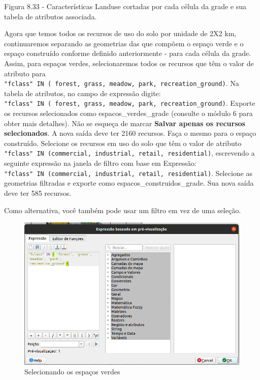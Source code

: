 \documentclass[
]{krantz}
\begin{document}
Figura 8.33 - Características Landuse cortadas por cada célula da grade e sua tabela de atributos associada.

Agora que temos todos os recursos de uso do solo por unidade de 2X2 km, continuaremos separando as geometrias das que compõem o espaço verde e o espaço construído conforme definido anteriormente - para cada célula da grade. Assim, para espaços verdes, selecionaremos todos os recursos que têm o valor de atributo para \texttt{"fclass"\ IN\ (\ \textquotesingle{}forest\textquotesingle{},\ \textquotesingle{}grass\textquotesingle{},\ \textquotesingle{}meadow\textquotesingle{},\ \textquotesingle{}park\textquotesingle{},\ \textquotesingle{}recreation\_ground\textquotesingle{})}. Na tabela de atributos, no campo de expressão digite: \texttt{"fclass"\ IN\ (\ \textquotesingle{}forest\textquotesingle{},\ \textquotesingle{}grass\textquotesingle{},\ \textquotesingle{}meadow\textquotesingle{},\ \textquotesingle{}park\textquotesingle{},\ \textquotesingle{}recreation\_ground\textquotesingle{})}. Exporte os recursos selecionados como espacos\_verdes\_grade (consulte o módulo 6 para obter mais detalhes). Não se esqueça de marcar \textbf{Salvar apenas os recursos selecionados}. A nova saída deve ter 2160 recursos. Faça o mesmo para o espaço construído. Selecione os recursos em uso do solo que têm o valor de atributo \texttt{"fclass"\ IN\ (\textquotesingle{}commercial\textquotesingle{},\ \textquotesingle{}industrial\textquotesingle{},\ \textquotesingle{}retail\textquotesingle{},\ \textquotesingle{}residential\textquotesingle{})}, escrevendo a seguinte expressão na janela de filtro com base em Expressão: \texttt{"fclass"\ IN\ (\textquotesingle{}commercial\textquotesingle{},\ \textquotesingle{}industrial\textquotesingle{},\ \textquotesingle{}retail\textquotesingle{},\ \textquotesingle{}residential\textquotesingle{})}. Selecione as geometrias filtradas e exporte como espacos\_construidos\_grade. Sua nova saída deve ter 585 recursos.

Como alternativa, você também pode usar um filtro em vez de uma seleção.

\begin{figure}
\centering
\includegraphics{media/modulo8/fig834_a.png}
\caption{Selecionando os espaços verdes}
\end{figure}
\end{document}
